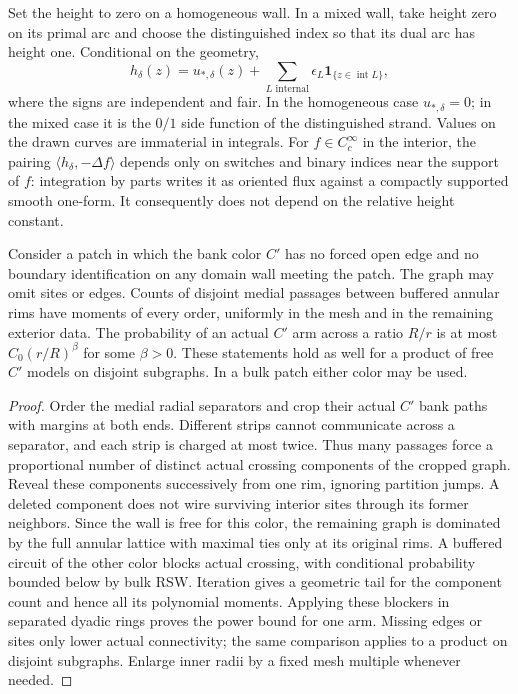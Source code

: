 Set the height to zero on a homogeneous wall.  In a mixed wall, take
height zero on its primal arc and choose the distinguished index so
that its dual arc has height one.  Conditional on the geometry,
\begin{equation}\label{q4field:domain-height}
 h_\delta(z)=u_{*,\delta}(z)
      +\sum_{L\text{ internal}}\epsilon_L
                    \mathbf1_{\{z\in\operatorname{int}L\}},
\end{equation}
where the signs are independent and fair.  In the homogeneous case
$u_{*,\delta}=0$; in the mixed case it is the $0/1$ side function of
the distinguished strand.  Values on the drawn curves are immaterial
in integrals.  For $f\in C_c^\infty$ in the interior, the pairing
$\langle h_\delta,-\Delta f\rangle$ depends only on switches and
binary indices near the support of $f$: integration by parts writes
it as oriented flux against a compactly supported smooth one-form.
It consequently does not depend on the relative height constant.

\begin{lemma}\label{q4field:free-bank}
Consider a patch in which the bank color $C'$ has no forced open edge
and no boundary identification on any domain wall meeting the patch.
The graph may omit sites or edges.  Counts of disjoint medial
passages between buffered annular rims have moments of every order,
uniformly in the mesh and in the remaining exterior data.  The
probability of an actual $C'$ arm across a ratio $R/r$ is at most
$C_0(r/R)^\beta$ for some $\beta>0$.  These statements hold as well
for a product of free $C'$ models on disjoint subgraphs.  In a bulk
patch either color may be used.
\end{lemma}

\begin{proof}
Order the medial radial separators and crop their actual $C'$ bank
paths with margins at both ends.  Different strips cannot communicate
across a separator, and each strip is charged at most twice.  Thus
many passages force a proportional number of distinct actual
crossing components of the cropped graph.  Reveal these components
successively from one rim, ignoring partition jumps.  A deleted
component does not wire surviving interior sites through its former
neighbors.  Since the wall is free for this color, the remaining
graph is dominated by the full annular lattice with maximal ties
only at its original rims.  A buffered circuit of the other color
blocks actual crossing, with conditional probability bounded below
by bulk RSW.  Iteration gives a geometric tail for the component
count and hence all its polynomial moments.  Applying these blockers
in separated dyadic rings proves the power bound for one arm.
Missing edges or sites only lower actual connectivity; the same
comparison applies to a product on disjoint subgraphs.  Enlarge
inner radii by a fixed mesh multiple whenever needed.
\end{proof}

